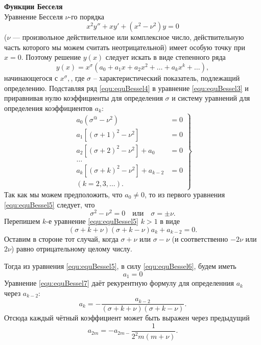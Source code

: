 \textbf{Функции Бесселя}\\
Уравнение Бесселя $\nu$-го порядка
\begin{equation}
	x^2y'' + x y' + (x^2 - \nu^2) y = 0
	\label{equ:equBessel3}
\end{equation}
($\nu$ --- произвольное действительное или комплексное число, действительную часть которого мы можем считать неотрицательной) имеет особую точку при $x = 0$. Поэтому решение $y(x)$ следует искать в виде степенного ряда
\begin{equation}
	y(x) = x^\sigma (a_0 + a_1 x + a_2 x^2 + \ldots  + a_k x^k + \ldots),
	\label{equ:equBessel4}
\end{equation}
начинающегося с $x^\sigma,$, где $\sigma$ -- характеристический показатель, подлежащий определению. Подставляя ряд \eqref{equ:equBessel4} в уравнение \eqref{equ:equBessel3} и приравнивая нулю коэффициенты для определения $\sigma$ и систему уравнений для определения коэффициентов $a_k$:
\begin{equation}
	\left.
	\begin{aligned}
		a_0(\sigma^@ - \nu^2) &= 0\\
		a_1 [(\sigma + 1)^2 - \nu^2] &= 0\\
		a_2 [(\sigma + 2)^2 - \nu^2] + a_0 &= 0\\
		\ldots\\
		a_k[(\sigma + k)^2 - \nu^2] + a_{k - 2} &= 0\\
		(k = 2, 3, \ldots).
	\end{aligned}
	\right\}
	\label{equ:equBessel5}
\end{equation}
Так как мы можем предположить, что $a_0 \neq 0$, то из первого уравнения \eqref{equ:equBessel5} следует, что 
\begin{equation}
	\sigma^2 - \nu^2 = 0 \quad \mbox{или} \quad \sigma = \pm \nu.
	\label{equ:equBessel6}
\end{equation}
Перепишем $k$-е уравнение \eqref{equ:equBessel5} $k > 1$ в виде 
\begin{equation}
	(\sigma + k + \nu)(\sigma + k - \nu) a_k + a_{k - 2} = 0.
	\label{equ:equBessel7}
\end{equation}
Оставим в стороне тот случай, когда $\sigma + \nu$ или $\sigma - \nu$ (и соответственно $- 2 \nu$ или $2 \nu$) равно отрицательному целому числу. 

Тогда из уравнения \eqref{equ:equBessel5}, в силу \eqref{equ:equBessel6}, будем иметь
\[
	a_1 = 0
\]
Уравнение \eqref{equ:equBessel7} даёт рекурентную формулу для определенния $a_k$ через $a_{k -2}$:
\[
	a_k = - \frac{a_{k - 2}}{(\sigma + k + \nu) (\sigma + k - \nu)}.
\]
Отсюда каждый чётный коэффициент может быть выражен через предыдущий
\[
	a_{2m} = - a_{2m - } \frac{1}{2^2 m (m + \nu)}.
\]

